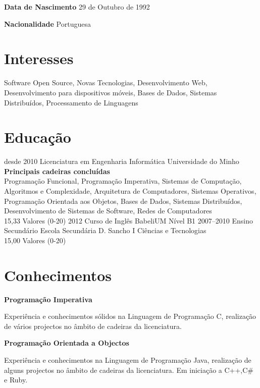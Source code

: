 \documentclass[]{friggeri-cv}
\begin{document}
\begin{multicols}{2}
\textbf{Data de Nascimento} 29 de Outubro de 1992 

\textbf{Nacionalidade} Portuguesa
\end{multicols}

\section{Interesses}

Software Open Source, Novas Tecnologias, Desenvolvimento Web, Desenvolvimento para dispositivos 
móveis, Bases de Dados, Sistemas Distribuídos, Processamento de Linguagens

\section{Educação}

\begin{entrylist}
  \entry
    {desde 2010}
    {Licenciatura em Engenharia Informática}
    {Universidade do Minho}
    {{\bf Principais cadeiras concluídas} \\ 
    Programação Funcional, Programação Imperativa, 
    Sistemas de Computação, Algoritmos e Complexidade, 
    Arquitetura de Computadores, Sistemas Operativos, 
    Programação Orientada aos Objetos, Bases de Dados,
    Sistemas Distribuídos, Desenvolvimento de Sistemas de Software,
    Redes de Computadores  \\ 15,33 Valores (0-20)}
  \entry
    {2012}
    {Curso de Inglês}
    {BabeliUM}
    {Nível B1}
  \entry
    {2007–2010}
    {Ensino Secundário}
    {Escola Secundária D. Sancho I}
    {Ciências e Tecnologias \\ 15,00 Valores (0-20)}
\end{entrylist}

\section{Conhecimentos}

\textbf{\large Programação Imperativa}

Experiência e conhecimentos sólidos na Linguagem de Programação C, realização de 
vários projectos no âmbito de cadeiras da licenciatura.

\textbf{\large Programação Orientada a Objectos}

Experiência e conhecimentos na Linguagem de Programação Java, realização de 
alguns projectos no âmbito de cadeiras da licenciatura. Em iniciação a C++,C\# e 
Ruby.
\end{document}
